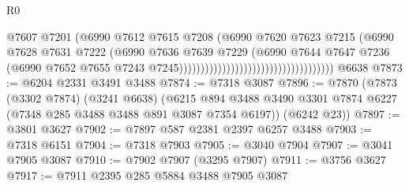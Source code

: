 \begin{lexlean}{R0}
\begin{coremodule}
                                                                @7607
                                                                @7201
                                                                (@6990
                                                                  @7612
                                                                  @7615
                                                                  @7208
                                                                  (@6990
                                                                    @7620
                                                                    @7623
                                                                    @7215
                                                                    (@6990
                                                                      @7628
                                                                      @7631
                                                                      @7222
                                                                      (@6990
                                                                        @7636
                                                                        @7639
                                                                        @7229
                                                                        (@6990
                                                                          @7644
                                                                          @7647
                                                                          @7236
                                                                          (@6990
                                                                            @7652
                                                                            @7655
                                                                            @7243
                                                                            @7245))))))))))))))))))))))))))))))))))))
    @6638
@7873 := @6204 @2331 @3491 @3488
@7874 := @7318 @3087
@7896 := @7870
    (@7873
      (@3302 @7874)
      (@3241 @6638)
      (@6215 @894 @3488 @3490 @3301 @7874 @6227 (@7348 @285 @3488 @3488 @891 @3087 @7354 @6197))
      (@6242 @23))
@7897 := @3801 @3627
@7902 := @7897 @587 @2381 @2397 @6257 @3488
@7903 := @7318 @6151
@7904 := @7318 @7903
@7905 := @3040 @7904
@7907 := @3041 @7905 @3087
@7910 := @7902 @7907 (@3295 @7907)
@7911 := @3756 @3627
@7917 := @7911 @2395 @285 @5884 @3488 @7905 @3087

\end{coremodule}
\end{lexlean}

